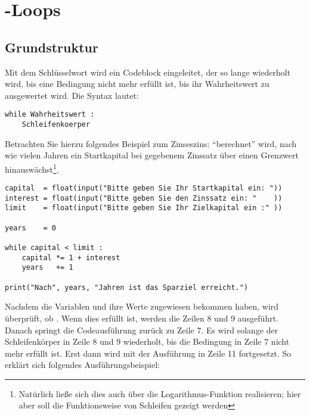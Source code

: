 \section{-Loops}
\subsection{Grundstruktur}
Mit dem Schlüsselwort  wird ein Codeblock eingeleitet, der so lange wiederholt wird, bis eine Bedingung nicht mehr erfüllt ist, \ie bis ihr Wahrheitswert zu  ausgewertet wird. Die Syntax lautet:

\begin{codebox}
\begin{verbatim}
while Wahrheitswert :
    Schleifenkoerper
\end{verbatim}
\end{codebox}

Betrachten Sie hierzu folgendes Beispiel zum Zinseszins: \enquote{berechnet} wird, nach wie vielen Jahren ein Startkapital bei gegebenem Zinssatz über einen Grenzwert hinauswächst\footnote{Natürlich ließe sich dies auch über die Logarithmus-Funktion realisieren; hier aber soll die Funktionsweise von Schleifen gezeigt werden}.

\begin{codebox}
\begin{verbatim}
capital  = float(input("Bitte geben Sie Ihr Startkapital ein: "))
interest = float(input("Bitte geben Sie den Zinssatz ein: "    ))
limit    = float(input("Bitte geben Sie Ihr Zielkapital ein :" ))

years    = 0

while capital < limit :
    capital *= 1 + interest
    years   += 1

print("Nach", years, "Jahren ist das Sparziel erreicht.")
\end{verbatim}
\end{codebox}

Nachdem die Variablen  und  ihre Werte zugewiesen bekommen haben, wird überprüft, ob . Wenn dies erfüllt ist, werden die Zeilen 8 und 9 ausgeführt. Danach springt die Codeausführung zurück zu Zeile 7. Es wird solange der Schleifenkörper in Zeile 8 und 9 wiederholt, bis die Bedingung in Zeile 7 nicht mehr erfüllt ist. Erst dann wird mit der Ausführung in Zeile 11 fortgesetzt. So erklärt sich folgendes Ausführungsbeispiel:

